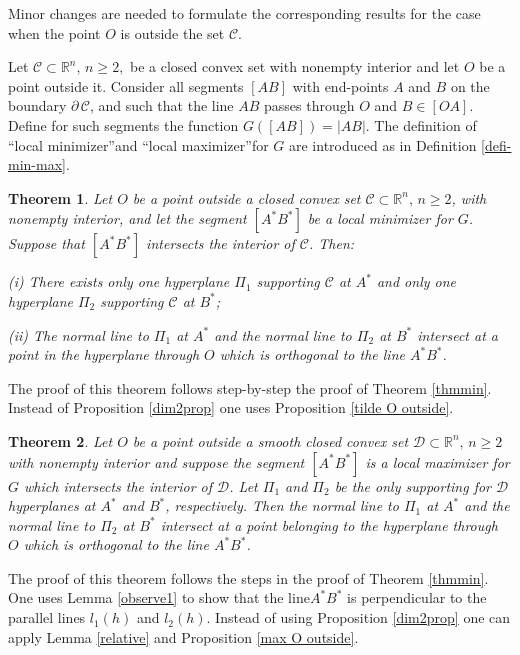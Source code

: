 \documentclass[a4paper,12pt]{amsart}
\newtheorem{thm}{Theorem}
\begin{document}
Minor changes are needed to formulate the corresponding results for the case when the point $O$ is outside the set $\mathcal C$.

Let $\mathcal C \subset \mathbb{R}^n,\, n \geq 2,$ be a closed convex set  with nonempty interior and let  $O$ be a point outside it.
Consider all segments $[AB]$
 with end-points $A$ and $B$ on the boundary $\partial \, \mathcal C$, and such that the line $AB$ passes through $O$ and $B \in [OA]$.
 Define for such segments the  function  $G([AB])=|AB|$. The definition of ``local minimizer''and ``local maximizer''for $G$ are introduced as in Definition \ref{defi-min-max}.

\begin{thm} \label{Ooutsidemin}
Let $O$ be a point outside a closed convex set $\mathcal C \subset
\mathbb{R}^n,\, n \geq 2$, with nonempty interior, and let the
segment $[A^*B^*]$ be a local minimizer for $G$. Suppose that
$[A^*B^*]$ intersects the interior of $\mathcal C$. Then:

(i) There exists only one hyperplane $\Pi_1$   supporting $\mathcal C$   at  $A^*$ and only one hyperplane $\Pi_2$ supporting $\mathcal C$  at $B^*$;

(ii) The normal line to $\Pi_1$ at $A^*$ and the normal line to
$\Pi_2$ at $B^*$ intersect at a point in the hyperplane through
$O$ which is orthogonal to the line $A^*B^*$.
\end{thm}
The proof of this theorem follows step-by-step the proof of Theorem \ref{thmmin}. Instead of Proposition \ref{dim2prop} one uses Proposition \ref{tilde O outside}.

\begin{thm}
Let $O$ be a point outside a smooth closed convex set $\mathcal D
\subset \mathbb{R}^n,\, n \geq 2$ with nonempty interior and
suppose the segment $[A^*B^*]$ is a local maximizer for $G$ which
intersects the interior of $\mathcal D$. Let $\Pi_1$ and $\Pi_2$
be the only supporting for $\mathcal D$ hyperplanes at $A^*$ and
$B^*$, respectively. Then the normal line to $\Pi_1$ at $A^*$ and
the normal line to $\Pi_2$ at $B^*$ intersect at a point belonging to the
hyperplane through $O$ which is orthogonal to the line $A^*B^*$.
\end{thm}

The proof of this theorem follows the steps in the proof of Theorem \ref{thmmin}.
One uses Lemma \ref{observe1}
to show that the line$A^*B^*$ is perpendicular to the parallel lines $l_1(h)$ and $l_2(h)$.
Instead of using Proposition \ref{dim2prop}
one can apply Lemma \ref{relative} and Proposition \ref{max O outside}.
\end{document}
